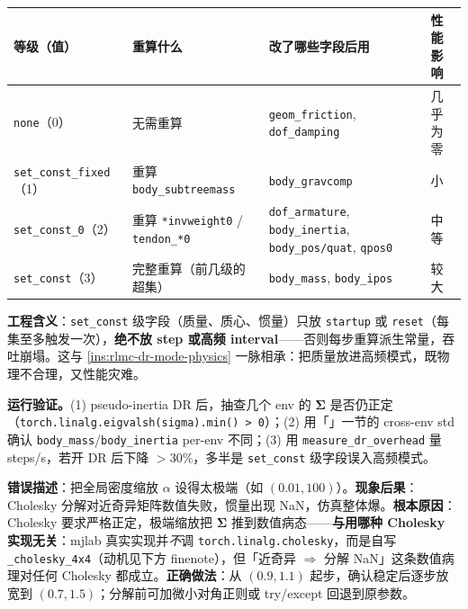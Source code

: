 \begin{center}
\small
\begin{tabular}{@{}lp{3.6cm}p{3.8cm}l@{}}
\toprule
等级（值） & 重算什么 & 改了哪些字段后用 & 性能影响 \\
\midrule
\verb|none|（0） & 无需重算 & \verb|geom_friction|, \verb|dof_damping| & 几乎为零 \\
\verb|set_const_fixed|（1） & 重算 \verb|body_subtreemass| & \verb|body_gravcomp| & 小 \\
\verb|set_const_0|（2） & 重算 \verb|*invweight0| / \verb|tendon_*0| & \verb|dof_armature|, \verb|body_inertia|, \verb|body_pos/quat|, \verb|qpos0| & 中等 \\
\verb|set_const|（3） & 完整重算（前几级的超集） & \verb|body_mass|, \verb|body_ipos| & 较大 \\
\bottomrule
\end{tabular}
\end{center}

\textbf{工程含义}：\verb|set_const| 级字段（质量、质心、惯量）只放 \verb|startup| 或 \verb|reset|（每集至多触发一次），\textbf{绝不放 step 或高频 interval}——否则每步重算派生常量，吞吐崩塌。这与 \cref{ins:rlmc-dr-mode-physics} 一脉相承：把质量放进高频模式，既物理不合理，又性能灾难。

\textbf{运行验证。}(1) pseudo-inertia DR 后，抽查几个 env 的 $\boldsymbol\Sigma$ 是否仍正定（\verb|torch.linalg.eigvalsh(sigma).min() > 0|）；(2) 用「」一节的 cross-env std 确认 \verb|body_mass|/\verb|body_inertia| per-env 不同；(3) 用 \verb|measure_dr_overhead| 量 steps/s，若开 DR 后下降 $>30\%$，多半是 \verb|set_const| 级字段误入高频模式。

\begin{pitfall}
\textbf{错误描述}：把全局密度缩放 $\alpha$ 设得太极端（如 $(0.01,100)$）。\textbf{现象后果}：Cholesky 分解对近奇异矩阵数值失败，惯量出现 NaN，仿真整体爆。\textbf{根本原因}：Cholesky 要求严格正定，极端缩放把 $\boldsymbol\Sigma$ 推到数值病态——\textbf{与用哪种 Cholesky 实现无关}：mjlab 真实实现并\emph{不}调 \verb|torch.linalg.cholesky|，而是自写 \verb|_cholesky_4x4|（动机见下方 finenote），但「近奇异 $\Rightarrow$ 分解 NaN」这条数值病理对任何 Cholesky 都成立。\textbf{正确做法}：从 $(0.9,1.1)$ 起步，确认稳定后逐步放宽到 $(0.7,1.5)$；分解前可加微小对角正则或 try/except 回退到原参数。
\end{pitfall}


